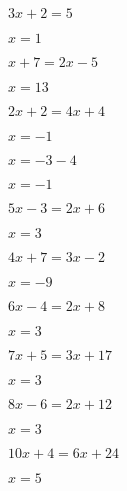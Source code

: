 \documentclass{ximera}
\begin{document}
\begin{exercise}
\begin{question} \( 3x + 2  = 5        \) \begin{oplossing} \(  x = 1  \) \end{oplossing} \end{question}
\begin{question} \( x + 7   = 2x - 5   \) \begin{oplossing} \(  x = 13 \) \end{oplossing} \end{question}
\begin{question} \( 2 x+2   = 4x + 4   \) \begin{oplossing} \(  x = -1 \) \end{oplossing} \end{question}
\begin{question} \( x       = -3 - 4   \) \begin{oplossing} \(  x = -1 \) \end{oplossing} \end{question}
\begin{question} \( 5x - 3  = 2x + 6   \) \begin{oplossing} \(  x = 3  \) \end{oplossing} \end{question}
\begin{question} \( 4x + 7  = 3x - 2   \) \begin{oplossing} \(  x = -9 \) \end{oplossing} \end{question}
\begin{question} \( 6x - 4  = 2x + 8   \) \begin{oplossing} \(  x = 3  \) \end{oplossing} \end{question}
\begin{question} \( 7x + 5  = 3x + 17  \) \begin{oplossing} \(  x = 3  \) \end{oplossing} \end{question}
\begin{question} \( 8x - 6  = 2x + 12  \) \begin{oplossing} \(  x = 3  \) \end{oplossing} \end{question}
\begin{question} \( 10x + 4 = 6x + 24  \) \begin{oplossing} \(  x = 5  \) \end{oplossing} \end{question}

\end{exercise}
\end{document}
